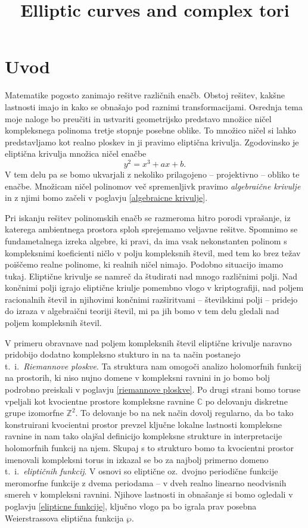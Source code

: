 \documentclass[mat1]{fmfdelo}
\title{Elliptic curves and complex tori}
\numberwithin{equation}{section}
\newcommand{\Z}{\mathbb Z}
\newcommand{\C}{\mathbb C}
\newcommand{\ti}{t.~i.\ }
\newcommand{\oz}{oz.\ }
\theoremstyle{definition}
\begin{document}


\section{Uvod}

Matematike pogosto zanimajo rešitve različnih enačb. Obstoj rešitev, kakšne lastnosti imajo in
kako se obnašajo pod raznimi transformacijami. Osrednja tema moje naloge bo preučiti in ustvariti
geometrijsko predstavo množice ničel kompleksnega polinoma tretje stopnje posebne oblike. 
To množico ničel si lahko predstavljamo kot realno ploskev in ji pravimo eliptična krivulja.   
Zgodovinsko je eliptična krivulja množica ničel enačbe
\[
    y^2 = x^3 + ax + b. 
\]
V tem delu pa se bomo ukvarjali z nekoliko prilagojeno -- projektivno -- obliko te enačbe. Množicam ničel
polinomov več spremenljivk pravimo \emph{algebraične krivulje} in z njimi bomo začeli v poglavju \ref{algebraicne krivulje}. 
\par 
Pri iskanju rešitev
polinomskih enačb se razmeroma hitro porodi vprašanje, iz katerega ambientnega prostora 
sploh sprejemamo veljavne rešitve. Spomnimo se fundametalnega izreka algebre, ki pravi, da ima
vsak nekonstanten polinom s kompleksnimi koeficienti ničlo v polju kompleksnih števil, med tem
ko brez težav poiščemo realne polinome, ki realnih ničel nimajo. Podobno situacijo imamo tukaj. 
Eliptične krivulje se namreč da študirati nad mnogo različnimi polji. Nad končnimi polji igrajo
eliptične kriulje pomembno vlogo v kriptografiji, nad poljem racionalnih števil in njihovimi končnimi razširitvami -- številskimi polji -- pridejo do izraza v algebraični teoriji
števil, mi pa jih bomo v tem delu gledali nad poljem kompleksnih števil. 
\par
V primeru obravnave nad poljem kompleksnih števil eliptične
krivulje naravno pridobijo dodatno kompleksno stukturo in na ta način postanejo \ti \emph{Riemannove ploskve}. Ta struktura nam omogoči analizo holomorfnih funkcij na prostorih, ki niso nujno domene v kompleksni ravnini in jo
bomo bolj podrobno preiskali v poglavju \ref{riemannove ploskve}.
Po drugi strani bomo toruse vpeljali kot kvocientne prostore kompleksne ravnine $\C$ po delovanju diskretne grupe izomorfne $\Z^2$. To delovanje bo na nek način dovolj regularno, da bo tako konstruirani kvocientni prostor prevzel ključne lokalne lastnosti kompleksne ravnine in nam tako olajšal definicijo kompleksne strukture in interpretacije holomorfnih funkcij na njem. Skupaj s to strukturo bomo ta kvocientni prostor imenovali kompleksni torus in izkazal se bo za najbolj primerno domeno \ti \emph{eliptičnih funkcij}. V osnovi so eliptične \oz dvojno periodične funkcije meromorfne funkcije z dvema periodama -- v dveh realno linearno neodvisnih smereh v kompleksni ravnini. Njihove lastnosti in obnašanje si bomo ogledali v poglavju \ref{elipticne funkcije}, ključno vlogo pa bo igrala prav posebna Weierstrassova eliptična funkcija $\wp$.
\end{document}
